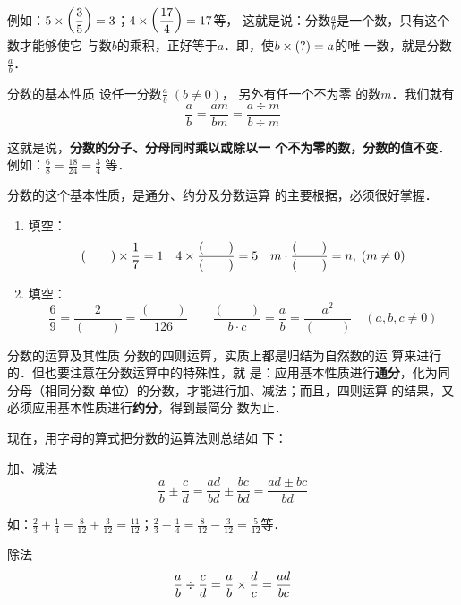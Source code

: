 例如：$5\times\left(\dfrac{3}{5}\right)=3$；$4\times\left(\dfrac{17}{4}\right)=17$等，
这就是说：分数$\frac{a}{b}$是一个数，只有这个数才能够使它
与数$b$的乘积，正好等于$a$．即，使$b\times(?)=a$的唯
一数，就是分数$\frac{a}{b}$．

\begin{blk}{分数的基本性质}
    设任一分数$\frac{a}{b}\; (b\ne 0)$，
另外有任一个不为零
的数$m$．我们就有
\[\frac{a}{b}=\frac{am}{bm}=\frac{a\div m}{b\div m} \]
\end{blk}

这就是说，\textbf{分数的分子、分母同时乘以或除以一
个不为零的数，分数的值不变}．例如：$\frac{6}{8}=\frac{18}{24}=\frac{3}{4}$
等．

分数的这个基本性质，是通分、约分及分数运算
的主要根据，必须很好掌握．

\begin{ex}
    \begin{enumerate}
        \item 填空：\[(\qquad )\times \dfrac{1}{7}=1 \quad 4\times\dfrac{(\qquad)}{(\qquad )}=5 \quad m\cdot \dfrac{(\qquad)}{(\qquad )}=n,\; (m\ne 0)\]
        \item 填空：\[\frac{6}{9}=\frac{2}{(\qquad)}=\frac{(\qquad)}{126} \qquad\frac{(\qquad )}{b\cdot c}=\frac{a}{b}=\frac{a^2}{(\qquad )}\quad (a,b,c\ne 0)\]
    \end{enumerate}
\end{ex}


\begin{blk}{分数的运算及其性质}
    分数的四则运算，实质上都是归结为自然数的运
算来进行的．但也要注意在分数运算中的特殊性，就
是：应用基本性质进行\textbf{通分}，化为同分母（相同分数
单位）的分数，才能进行加、减法；而且，四则运算
的结果，又必须应用基本性质进行\textbf{约分}，得到最简分
数为止．
\end{blk}


现在，用字母的算式把分数的运算法则总结如
下：

\begin{blk}{加、减法}
    \[\frac{a}{b}\pm\frac{c}{d}=\frac{ad}{bd}\pm\frac{bc}{bd}=\frac{ad\pm bc}{bd} \]
\end{blk}

如：$\frac{2}{3}+\frac{1}{4}=\frac{8}{12}+\frac{3}{12}=\frac{11}{12}$；$\frac{2}{3}-\frac{1}{4}=\frac{8}{12}-\frac{3}{12}=\frac{5}{12}$等．

\begin{blk}{除法}
    \[\dfrac{a}{b}\div \dfrac{c}{d}=\dfrac{a}{b}\times\dfrac{d}{c}=\dfrac{ad}{bc}\]
\end{blk}

